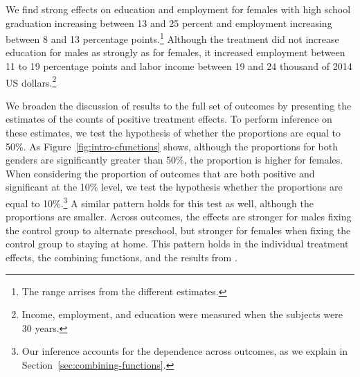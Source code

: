We find strong effects on education and employment for females with high school graduation increasing between 13 and 25 percent and employment increasing between 8 and 13 percentage points.\footnote{The range arrises from the different estimates.} Although the treatment did not increase education for males as strongly as for females, it increased employment between 11 to 19 percentage points and labor income between 19 and 24 thousand of 2014 US dollars.\footnote{Income, employment, and education were measured when the subjects were 30 years.}

We broaden the discussion of results to the full set of outcomes by presenting the estimates of the counts of positive treatment effects. To perform inference on these estimates, we test the hypothesis of whether the proportions are equal to 50\%. As Figure~\ref{fig:intro-cfunctions} shows, although the proportions for both genders are significantly greater than 50\%, the proportion is higher for females. When considering the proportion of outcomes that are both positive and significant at the 10\% level, we test the hypothesis whether the proportions are equal to 10\%.\footnote{Our inference accounts for the dependence across outcomes, as we explain in Section~\ref{sec:combining-functions}.} A similar pattern holds for this test as well, although the proportions are smaller. Across outcomes, the effects are stronger for males fixing the control group to alternate preschool, but stronger for females when fixing the control group to staying at home. This pattern holds in the individual treatment effects, the combining functions, and the results from \citet{Garcia_Heckman_Leaf_etal_2017_Comp_CBA_Unpublished}.

